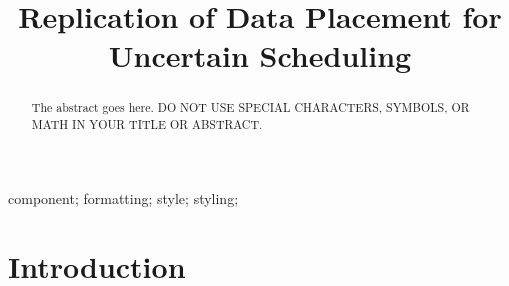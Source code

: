 \documentclass[10pt, conference, compsocconf]{IEEEtran}
\begin{document}
%
\title{Replication of Data Placement for Uncertain Scheduling}



\author{

}





\maketitle


\begin{abstract}
The abstract goes here. DO NOT USE SPECIAL CHARACTERS, SYMBOLS, OR MATH IN YOUR TITLE OR ABSTRACT.

\end{abstract}

\begin{IEEEkeywords}
component; formatting; style; styling;

\end{IEEEkeywords}


%
\IEEEpeerreviewmaketitle

\section{Introduction}
\end{document}
